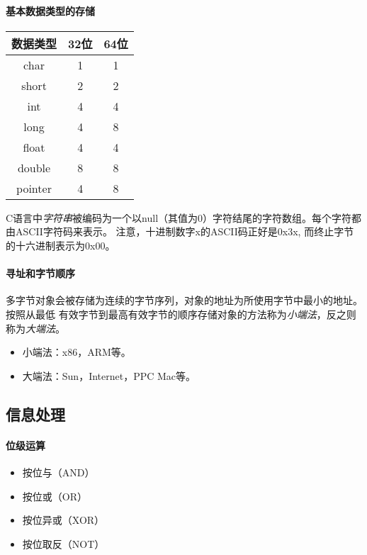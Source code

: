 \paragraph{基本数据类型的存储}
\begin{table}[htbp]
    \centering
    \begin{tabular}{|c|c|c|}
        \hline
        数据类型    & 32位 & 64位 \\
        \hline
        char    & 1   & 1   \\
        \hline
        short   & 2   & 2   \\
        \hline
        int     & 4   & 4   \\
        \hline
        long    & 4   & 8   \\
        \hline
        float   & 4   & 4   \\
        \hline
        double  & 8   & 8   \\
        \hline
        pointer & 4   & 8   \\
        \hline
    \end{tabular}
\end{table}
C语言中\emph{字符串}被编码为一个以null（其值为0）字符结尾的字符数组。每个字符都由ASCII字符码来表示。
注意，十进制数字x的ASCII码正好是0x3x, 而终止字节的十六进制表示为0x00。

\paragraph{寻址和字节顺序}
多字节对象会被存储为连续的字节序列，对象的地址为所使用字节中最小的地址。按照从最低
有效字节到最高有效字节的顺序存储对象的方法称为\emph{小端法}，反之则称为\emph{大端法}。
\begin{itemize}
    \item 小端法：x86，ARM等。
    \item 大端法：Sun，Internet，PPC Mac等。
\end{itemize}

\subsection{信息处理}

\paragraph{位级运算}
\begin{itemize}
    \item 按位与（AND）
    \item 按位或（OR）
    \item 按位异或（XOR）
    \item 按位取反（NOT）
\end{itemize}

